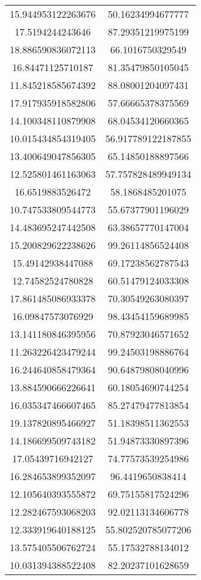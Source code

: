 \begin{table}
\begin{tabular}{cc}
15.944953122263676 & 50.16234994677777 \\
17.5194244243646 & 87.29351219975199 \\
18.886590836072113 & 66.1016750329549 \\
16.84471125710187 & 81.35479850105045 \\
11.845218585674392 & 88.08001204097431 \\
17.917935918582806 & 57.66665378375569 \\
14.100348110879908 & 68.04534120660365 \\
10.015434854319405 & 56.917789122187855 \\
13.400649047856305 & 65.14850188897566 \\
12.525801461163063 & 57.757828489949134 \\
16.6519883526472 & 58.1868485201075 \\
10.747533809544773 & 55.67377901196029 \\
14.483695247442508 & 63.38657770147004 \\
15.200829622238626 & 99.26114856524408 \\
15.49142938447088 & 69.17238562787543 \\
12.74582524780828 & 60.51479124033308 \\
17.861485086933378 & 70.30549263080397 \\
16.09847573076929 & 98.43454159689985 \\
13.141180846395956 & 70.87923046571652 \\
11.263226423479244 & 99.24503198886764 \\
16.244640858479364 & 90.64879808040996 \\
13.884590666226641 & 60.18054690744254 \\
16.035347466607465 & 85.27479477813854 \\
19.137820895466927 & 51.18398511362553 \\
14.186699509743182 & 51.94873330897396 \\
17.05439716942127 & 74.77573539254986 \\
16.284653899352097 & 96.4419650838414 \\
12.105640393555872 & 69.75155817524296 \\
12.282467593068203 & 92.02113134606778 \\
12.333919640188125 & 55.802520785077206 \\
13.575405506762724 & 55.17532788134012 \\
10.031394388522408 & 82.20237101628659 \\

\end{tabular}
\end{table}
